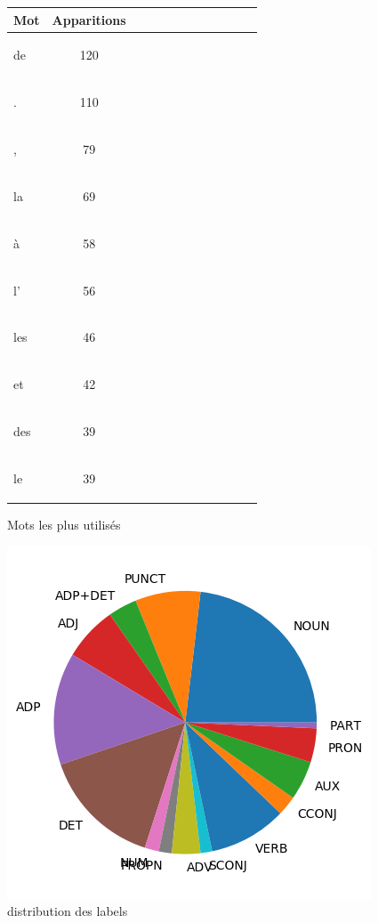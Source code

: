 \begin{figure}[H] \begin{minipage}{0.48\textwidth} \centering \begin{tabular}{|l || *{11 }{|c} |} \hline
Mot & Apparitions  \\ \hline
\begin{verb} de \end{verb} &120\\ \hline
\begin{verb} . \end{verb} &110\\ \hline
\begin{verb} , \end{verb} &79\\ \hline
\begin{verb} la \end{verb} &69\\ \hline
\begin{verb} à \end{verb} &58\\ \hline
\begin{verb} l' \end{verb} &56\\ \hline
\begin{verb} les \end{verb} &46\\ \hline
\begin{verb} et \end{verb} &42\\ \hline
\begin{verb} des \end{verb} &39\\ \hline
\begin{verb} le \end{verb} &39\\ \hline

\end{tabular}
\caption{ Mots les plus utilisés } \label{Fig:muw}\end{minipage} 
\begin{minipage}{0.48\textwidth} \centering
\label{Fig:partuttest_img.png}
\caption{distribution des labels}\includegraphics[width=.7\linewidth]{partuttest_img.png}

\end{minipage}
\end{figure}


